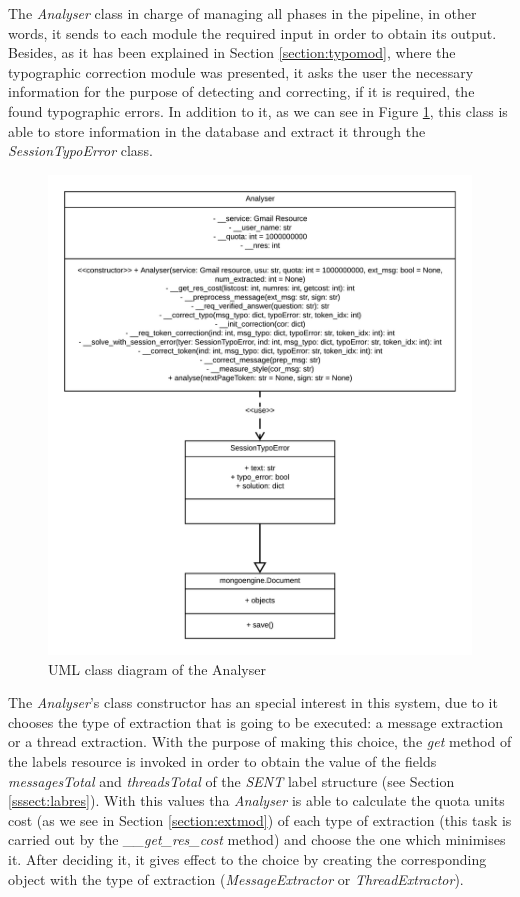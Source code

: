 The \textit{Analyser} class in charge of managing all phases in the pipeline, in other words, it sends to each module the required input in order to obtain its output. Besides, as it has been explained in Section \ref{section:typomod}, where the typographic correction module was presented, it asks the user the necessary information for the purpose of detecting and correcting, if it is required, the found typographic errors. In addition to it, as we can see in Figure \ref{fig:umlanalyser}, this class is able to store information in the database and extract it through the \textit{SessionTypoError} class.

\begin{figure}[h]
	\centering%
	\centerline{\includegraphics[width=0.6\paperwidth]{Imagenes/Bitmap/Analyser/analyserUML.png}}%
	\caption{UML class diagram of the Analyser}%
	\label{fig:umlanalyser}
\end{figure}

The \textit{Analyser}'s class constructor has an special interest in this system, due to it chooses the type of extraction that is going to be executed: a message extraction or a thread extraction. With the purpose of making this choice, the \textit{get} method of the labels resource is invoked in order to obtain the value of the fields \textit{messagesTotal} and \textit{threadsTotal} of the \textit{SENT} label structure (see Section \ref{sssect:labres}). With this values tha \textit{Analyser} is able to calculate the quota units cost (as we see in Section \ref{section:extmod}) of each type of extraction (this task is carried out by the \textit{\_\_get\_res\_cost} method) and choose the one which minimises it. After deciding it, it gives effect to the choice by creating the corresponding object with the type of extraction (\textit{MessageExtractor} or \textit{ThreadExtractor}).


